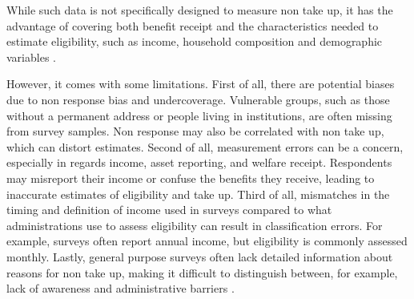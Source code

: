 While such data is not specifically designed to measure non take up, it has the advantage of covering both benefit receipt and the characteristics needed to estimate eligibility, such as income, household composition and demographic variables \citep{mechelen_who_2017}.

However, it comes with some limitations. First of all, there are potential biases due to non response bias and undercoverage. Vulnerable groups, such as those without a permanent address or people living in institutions, are often missing from survey samples. Non response may also be correlated with non take up, which can distort estimates. Second of all, measurement errors can be a concern, especially in regards income, asset reporting, and welfare receipt. Respondents may misreport their income or confuse the benefits they receive, leading to inaccurate estimates of eligibility and take up. Third of all, mismatches in the timing and definition of income used in surveys compared to what administrations use to assess eligibility can result in classification errors. For example, surveys often report annual income, but eligibility is commonly assessed monthly. Lastly, general purpose surveys often lack detailed information about reasons for non take up, making it difficult to distinguish between, for example, lack of awareness and administrative barriers \citep{mechelen_who_2017}.

